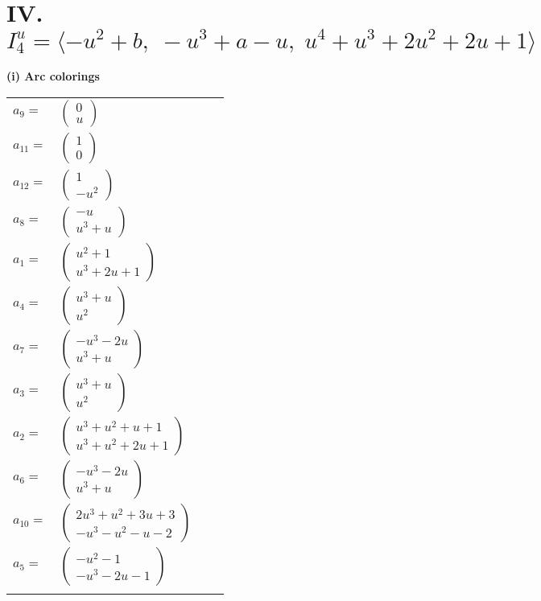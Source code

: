 \documentclass[1p]{elsarticle_modified}
\theoremstyle{definition}
\begin{document}
\centering \section*{IV. $I^u_{4}= \langle - u^2+b,\;- u^3+a- u,\;u^4+u^3+2 u^2+2 u+1 \rangle$}
\flushleft \textbf{(i) Arc colorings}\\
\begin{tabular}{m{7pt} m{180pt} m{7pt} m{180pt} }
\flushright $a_{9}=$&$\begin{pmatrix}0\\u\end{pmatrix}$ \\
\flushright $a_{11}=$&$\begin{pmatrix}1\\0\end{pmatrix}$ \\
\flushright $a_{12}=$&$\begin{pmatrix}1\\- u^2\end{pmatrix}$ \\
\flushright $a_{8}=$&$\begin{pmatrix}- u\\u^3+u\end{pmatrix}$ \\
\flushright $a_{1}=$&$\begin{pmatrix}u^2+1\\u^3+2 u+1\end{pmatrix}$ \\
\flushright $a_{4}=$&$\begin{pmatrix}u^3+u\\u^2\end{pmatrix}$ \\
\flushright $a_{7}=$&$\begin{pmatrix}- u^3-2 u\\u^3+u\end{pmatrix}$ \\
\flushright $a_{3}=$&$\begin{pmatrix}u^3+u\\u^2\end{pmatrix}$ \\
\flushright $a_{2}=$&$\begin{pmatrix}u^3+u^2+u+1\\u^3+u^2+2 u+1\end{pmatrix}$ \\
\flushright $a_{6}=$&$\begin{pmatrix}- u^3-2 u\\u^3+u\end{pmatrix}$ \\
\flushright $a_{10}=$&$\begin{pmatrix}2 u^3+u^2+3 u+3\\- u^3- u^2- u-2\end{pmatrix}$ \\
\flushright $a_{5}=$&$\begin{pmatrix}- u^2-1\\- u^3-2 u-1\end{pmatrix}$\\&\end{tabular}
\end{document}
